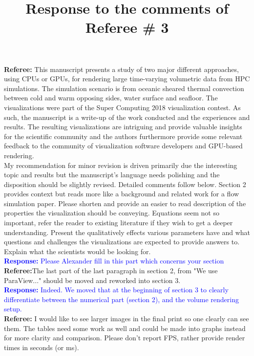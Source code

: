 \documentclass[]{article}
\title{Response to the comments of Referee \# 3}
\begin{document}
\maketitle
\textbf{Referee:} This manuscript presents a study of two major different approaches, using CPUs or GPUs, for rendering large time-varying volumetric data from HPC simulations. The simulation scenario is from oceanic sheared thermal convection between cold and warm opposing sides, water surface and seafloor. The visualizations were part of the Super Computing 2018 visualization contest. As such, the manuscript is a write-up of the work conducted and the experiences and results.
The resulting visualizations are intriguing and provide valuable insights for the scientific community and the authors furthermore provide some relevant feedback to the community of visualization software developers and GPU-based rendering. \\

My recommendation for minor revision is driven primarily due the interesting topic and results but the manuscript's language needs polishing and the disposition should be slightly revised. Detailed comments follow below.
Section 2 provides context but reads more like a background and related work for a flow simulation paper. Please shorten and provide an easier to read description of the properties the visualization should be conveying. Equations seem not so important, refer the reader to existing literature if they wish to get a deeper understanding. Present the qualitatively effects various parameters have and what questions and challenges the visualizations are expected to provide answers to. Explain what the scientists would be looking for. \\

\textcolor{blue}{\textbf{Response:} Please Alexander fill in this part which concerns your section} \\

\textbf{Referee:}The last part of the last paragraph in section 2, from "We use ParaView..." should be moved and reworked into section 3. \\

\textcolor{blue}{\textbf{Response:} Indeed. We moved that at the beginning of section 3 to clearly differentiate between the numerical part (section 2), and the volume rendering setup.} \\

\textbf{Referee:} I would like to see larger images in the final print so one clearly can see them. The tables need some work as well and could be made into graphs instead for more clarity and comparison. Please don't report FPS, rather provide render times in seconds (or ms). \\
\end{document}
